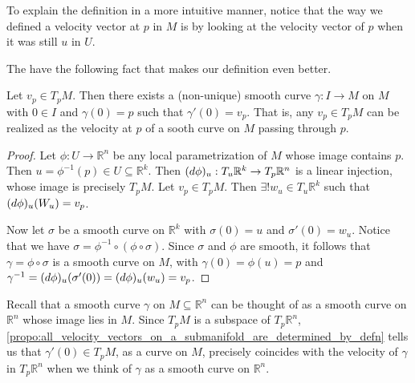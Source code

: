 \documentclass[notoc,notitlepage]{tufte-book}
\begin{document}
\begin{remark}
  To explain the definition in a more intuitive manner, notice that the way we
  defined a velocity vector at $p$ in $M$ is by looking at the velocity vector
  of $p$ when it was still $u$ in $U$.
\end{remark}

The have the following fact that makes our definition even better.

\begin{propo}\label{propo:all_velocity_vectors_on_a_submanifold_are_determined_by_defn}
  Let $v_p \in T_p M$. Then there exists a (non-unique) smooth curve $\gamma : I
  \to M$ on $M$ with $0 \in I$ and $\gamma(0) = p$ such that $\gamma'(0) = v_p$.
  That is, any $v_p \in T_p M$ can be realized as the velocity at $p$ of a sooth
  curve on $M$ passing through $p$.
\end{propo}

\begin{proof}
  Let $\phi: U \to \mathbb{R}^n$ be any local parametrization of $M$ whose image
  contains $p$. Then $u = \phi^{-1}(p) \in U \subseteq \mathbb{R}^k$. Then
  $(\mathop{}\!d{\phi})_u : T_u \mathbb{R}^k \to T_p \mathbb{R}^n$ is a linear
  injection, whose image is precisely $T_p M$. Let $v_p \in T_p M$. Then
  $\exists! w_u \in T_u \mathbb{R}^k$ such that $(\mathop{}\!d{\phi})_u (W_u) = v_p$.

  Now let $\sigma$ be a smooth curve on $\mathbb{R}^k$ with $\sigma(0) = u$ and
  $\sigma'(0) = w_u$. Notice that we have $\sigma = \phi^{-1} \circ ( \phi \circ
  \sigma)$. Since $\sigma$ and $\phi$ are smooth, it follows that $\gamma = \phi
  \circ \sigma$ is a smooth curve on $M$, with $\gamma(0) = \phi(u) = p$ and
  $\gamma^{-1} = (\mathop{}\!d{\phi})_u (\sigma'(0)) = (\mathop{}\!d{\phi})_u (w_u) = v_p$.
\end{proof}

\begin{note}
  Recall that a smooth curve $\gamma$ on $M \subseteq \mathbb{R}^n$ can be
  thought of as a smooth curve on $\mathbb{R}^n$ whose image lies in $M$. Since
  $T_p M$ is a subspace of $T_p \mathbb{R}^n$,
  \cref{propo:all_velocity_vectors_on_a_submanifold_are_determined_by_defn}
  tells us that $\gamma'(0) \in T_p M$, as a curve on $M$, precisely coincides
  with the velocity of $\gamma$ in $T_p \mathbb{R}^n$ when we think of $\gamma$
  as a smooth curve on $\mathbb{R}^n$.
\end{note}
\end{document}
